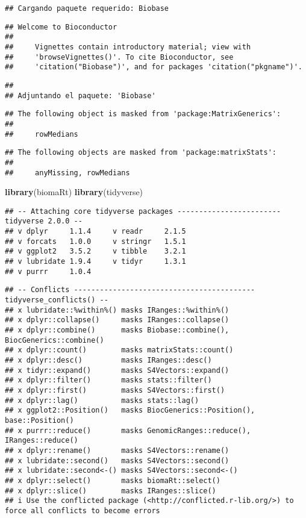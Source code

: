 \documentclass[
]{article}
\newenvironment{Shaded}{\begin{snugshade}}{\end{snugshade}}
\newcommand{\FunctionTok}[1]{\textcolor[rgb]{0.13,0.29,0.53}{\textbf{#1}}}
\newcommand{\NormalTok}[1]{#1}
\begin{document}
\begin{verbatim}
## Cargando paquete requerido: Biobase
\end{verbatim}

\begin{verbatim}
## Welcome to Bioconductor
## 
##     Vignettes contain introductory material; view with
##     'browseVignettes()'. To cite Bioconductor, see
##     'citation("Biobase")', and for packages 'citation("pkgname")'.
\end{verbatim}

\begin{verbatim}
## 
## Adjuntando el paquete: 'Biobase'
\end{verbatim}

\begin{verbatim}
## The following object is masked from 'package:MatrixGenerics':
## 
##     rowMedians
\end{verbatim}

\begin{verbatim}
## The following objects are masked from 'package:matrixStats':
## 
##     anyMissing, rowMedians
\end{verbatim}

\begin{Shaded}
\begin{Highlighting}[]
\FunctionTok{library}\NormalTok{(biomaRt)}
\FunctionTok{library}\NormalTok{(tidyverse)}
\end{Highlighting}
\end{Shaded}

\begin{verbatim}
## -- Attaching core tidyverse packages ------------------------ tidyverse 2.0.0 --
## v dplyr     1.1.4     v readr     2.1.5
## v forcats   1.0.0     v stringr   1.5.1
## v ggplot2   3.5.2     v tibble    3.2.1
## v lubridate 1.9.4     v tidyr     1.3.1
## v purrr     1.0.4
\end{verbatim}

\begin{verbatim}
## -- Conflicts ------------------------------------------ tidyverse_conflicts() --
## x lubridate::%within%() masks IRanges::%within%()
## x dplyr::collapse()     masks IRanges::collapse()
## x dplyr::combine()      masks Biobase::combine(), BiocGenerics::combine()
## x dplyr::count()        masks matrixStats::count()
## x dplyr::desc()         masks IRanges::desc()
## x tidyr::expand()       masks S4Vectors::expand()
## x dplyr::filter()       masks stats::filter()
## x dplyr::first()        masks S4Vectors::first()
## x dplyr::lag()          masks stats::lag()
## x ggplot2::Position()   masks BiocGenerics::Position(), base::Position()
## x purrr::reduce()       masks GenomicRanges::reduce(), IRanges::reduce()
## x dplyr::rename()       masks S4Vectors::rename()
## x lubridate::second()   masks S4Vectors::second()
## x lubridate::second<-() masks S4Vectors::second<-()
## x dplyr::select()       masks biomaRt::select()
## x dplyr::slice()        masks IRanges::slice()
## i Use the conflicted package (<http://conflicted.r-lib.org/>) to force all conflicts to become errors
\end{verbatim}
\end{document}
